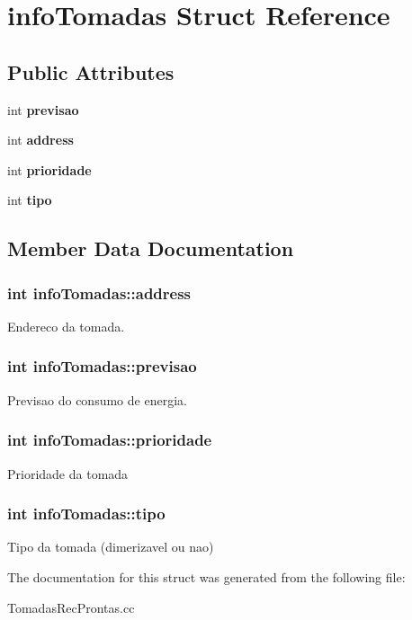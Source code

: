 \section{info\+Tomadas Struct Reference}
\label{structinfo_tomadas}
\subsection*{Public Attributes}
\begin{DoxyCompactItemize}
\item 
int {\bf previsao}
\item 
int {\bf address}
\item 
int {\bf prioridade}
\item 
int {\bf tipo}
\end{DoxyCompactItemize}


\subsection{Member Data Documentation}
\subsubsection[{address}]{\setlength{\rightskip}{0pt plus 5cm}int info\+Tomadas\+::address}\label{structinfo_tomadas_a89c8e4b2c21a8478e2ff22778d5d9eca}
Endereco da tomada. 
\subsubsection[{previsao}]{\setlength{\rightskip}{0pt plus 5cm}int info\+Tomadas\+::previsao}\label{structinfo_tomadas_add29a4ea588c1198cb91cf38f40b9451}
Previsao do consumo de energia. 
\subsubsection[{prioridade}]{\setlength{\rightskip}{0pt plus 5cm}int info\+Tomadas\+::prioridade}\label{structinfo_tomadas_ad89b1b21b89123c84749332412f8c59a}
Prioridade da tomada 
\subsubsection[{tipo}]{\setlength{\rightskip}{0pt plus 5cm}int info\+Tomadas\+::tipo}\label{structinfo_tomadas_a32cbb496aac12684a1365fd265bf6ff1}
Tipo da tomada (dimerizavel ou nao) 

The documentation for this struct was generated from the following file\+:\begin{DoxyCompactItemize}
\item 
Tomadas\+Rec\+Prontas.\+cc\end{DoxyCompactItemize}
